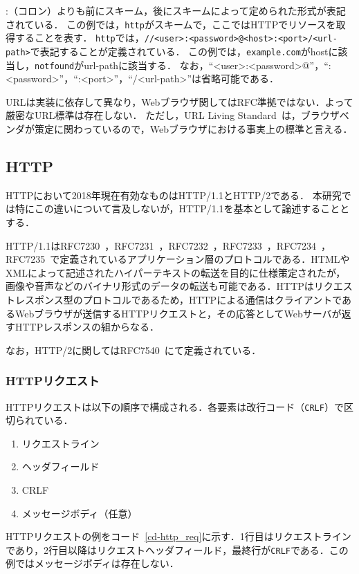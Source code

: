 :（コロン）よりも前にスキーム，後にスキームによって定められた形式が表記されている．
この例では，\texttt{http}がスキームで，ここではHTTPでリソースを取得することを表す．
\texttt{http}では，\texttt{//<user>:<password>@<host>:<port>/<url-path>}で表記することが定義されている．
この例では，\texttt{example.com}がhostに該当し，\texttt{notfound}がurl-pathに該当する．
なお，``<user>:<password>@''，``:<password>''，``:<port>''，``/<url-path>''は省略可能である．

URLは実装に依存して異なり，Webブラウザ関してはRFC準拠ではない．よって厳密なURL標準は存在しない．
ただし，URL Living Standard~\cite{url_ls}は，ブラウザベンダが策定に関わっているので，Webブラウザにおける事実上の標準と言える．

\subsection{HTTP}
HTTPにおいて2018年現在有効なものはHTTP/1.1とHTTP/2である．
本研究では特にこの違いについて言及しないが，HTTP/1.1を基本として論述することとする．

HTTP/1.1はRFC7230~\cite{rfc7230}，RFC7231~\cite{rfc7231}，RFC7232~\cite{rfc7232}，RFC7233~\cite{rfc7233}，RFC7234~\cite{rfc7234}，RFC7235~\cite{rfc7235}で定義されているアプリケーション層のプロトコルである．HTMLやXMLによって記述されたハイパーテキストの転送を目的に仕様策定されたが，画像や音声などのバイナリ形式のデータの転送も可能である．HTTPはリクエストレスポンス型のプロトコルであるため，HTTPによる通信はクライアントであるWebブラウザが送信するHTTPリクエストと，その応答としてWebサーバが返すHTTPレスポンスの組からなる．

なお，HTTP/2に関してはRFC7540~\cite{rfc7540}にて定義されている．
\subsubsection{HTTPリクエスト}
HTTPリクエストは以下の順序で構成される．各要素は改行コード（\texttt{CRLF}）で区切られている．
\begin{enumerate}
\item リクエストライン
\item ヘッダフィールド
\item CRLF
\item メッセージボディ（任意）
\end{enumerate}
HTTPリクエストの例をコード~\ref{cd-http_req}に示す．1行目はリクエストラインであり，2行目以降はリクエストヘッダフィールド，最終行が\texttt{CRLF}である．この例ではメッセージボディは存在しない．

